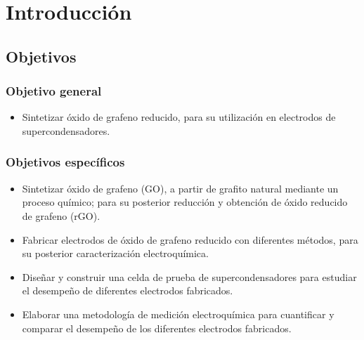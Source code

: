 \chapter{Introducción}
\section{Objetivos}
\subsection{Objetivo general}
\begin{itemize}
	\item Sintetizar óxido de grafeno reducido, para su utilización en electrodos de supercondensadores.
\end{itemize}
\subsection{Objetivos específicos}
\begin{itemize}
	\item Sintetizar óxido de grafeno (GO), a partir de grafito natural mediante un proceso químico; para su posterior reducción y obtención de óxido reducido de grafeno (rGO).
	\item Fabricar electrodos de óxido de grafeno reducido con diferentes métodos, para su posterior caracterización electroquímica.
	\item Diseñar y construir una celda de prueba de supercondensadores para estudiar el desempeño de diferentes electrodos fabricados.
	\item Elaborar una metodología de medición electroquímica para cuantificar y comparar el desempeño de los diferentes electrodos fabricados. 
\end{itemize}
